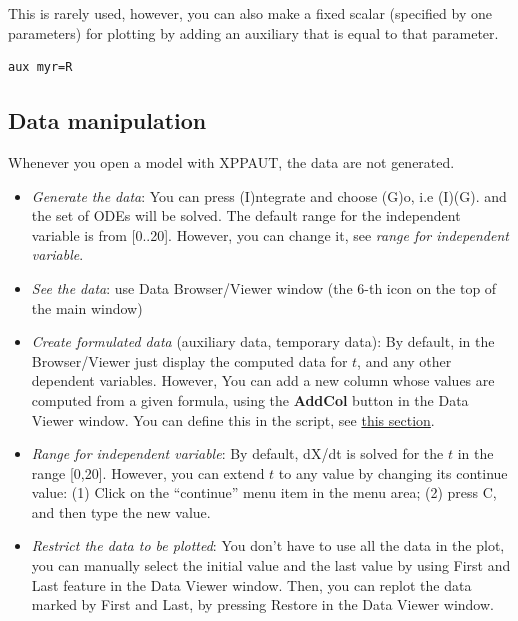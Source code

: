 This is rarely used, however, you can also make a fixed scalar
(specified by one parameters) for plotting by adding an auxiliary that
is equal to that parameter.

\begin{lstlisting}
aux myr=R
\end{lstlisting}


\subsection{Data manipulation}
\label{sec:data-manipulation}


Whenever you open a model with XPPAUT, the data are not generated. 
\begin{itemize}

\item {\it Generate the data}: You can press (I)ntegrate and choose
  (G)o, i.e (I)(G). and the set of ODEs will be solved. The default
  range for the independent variable is from [0..20]. However, you can
  change it, see {\it range for independent variable}.

\item {\it See the data}: use Data Browser/Viewer window (the 6-th
  icon on the top of the main window)


\item {\it Create formulated data} (auxiliary data, temporary data):
  By default, in the Browser/Viewer just display the computed data for
  $t$, and any other dependent variables. However, You can add a new
  column whose values are computed from a given formula, using the
  {\bf AddCol} button in the Data Viewer window. You can define this
  in the script, see \hyperref[sec:auxil-temp-quant]{this section}.

\item {\it Range for independent variable}: By default, dX/dt is
  solved for the $t$ in the range [0,20]. However, you can extend $t$
  to any value by changing its continue value: (1) Click on the
  ``continue'' menu item in the menu area; (2) press C, and then type
  the new value.


\item {\it Restrict the data to be plotted}: You don't have to use all
  the data in the plot, you can manually select the initial value and
  the last value by using First and Last feature in the Data Viewer
  window. Then, you can replot the data marked by First and Last, by
  pressing Restore in the Data Viewer window.

\end{itemize}




